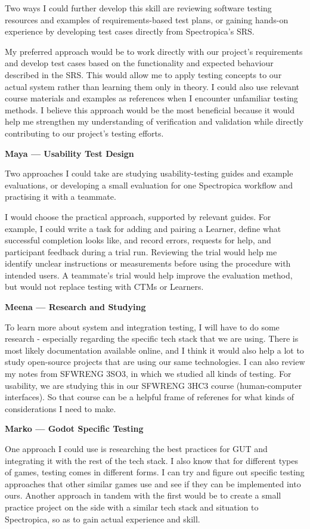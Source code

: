 \documentclass[12pt, titlepage]{article}
\newcounter{validation}
\begin{document}
\begin{enumerate}
Two ways I could further develop this skill are reviewing software testing
resources and examples of requirements-based test plans, or gaining hands-on
experience by developing test cases directly from Spectropica's SRS.

My preferred approach would be to work directly with our project's requirements
and develop test cases based on the functionality and expected behaviour
described in the SRS. This would allow me to apply testing concepts to our
actual system rather than learning them only in theory. I could also use
relevant course materials and examples as references when I encounter unfamiliar
testing methods. I believe this approach would be the most beneficial because it
would help me strengthen my understanding of verification and validation while
directly contributing to our project's testing efforts.

\textbf{Maya --- Usability Test Design}

Two approaches I could take are studying usability-testing guides and example
evaluations, or developing a small evaluation for one Spectropica workflow and
practising it with a teammate.

I would choose the practical approach, supported by relevant guides. For
example, I could write a task for adding and pairing a Learner, define what
successful completion looks like, and record errors, requests for help, and
participant feedback during a trial run. Reviewing the trial would help me
identify unclear instructions or measurements before using the procedure with
intended users. A teammate's trial would help improve the evaluation method, but
would not replace testing with CTMs or Learners.

\textbf{Meena --- Research and Studying}

To learn more about system and integration testing, I will have to do some research - especially
regarding the specific tech stack that we are using. There is most likely documentation available online, and I think
it would also help a lot to study open-source projects that are using our same technologies. I can also review my notes
from SFWRENG 3SO3, in which we studied all kinds of testing. For usability, we are studying this in our SFWRENG 3HC3 course (human-computer interfaces).
So that course can be a helpful frame of referenes for what kinds of considerations I need to make.

\textbf{Marko --- Godot Specific Testing}

One approach I could use is researching the best practices for GUT and integrating it with the rest of the tech stack. I also know that for different types of games, testing comes in different forms. I can try and figure out specific testing approaches that other similar games use and see if they can be implemented into ours.
Another approach in tandem with the first would be to create a small practice project on the side with a similar tech stack and situation to Spectropica, so as to gain actual experience and skill.


\end{enumerate}
\end{document}
